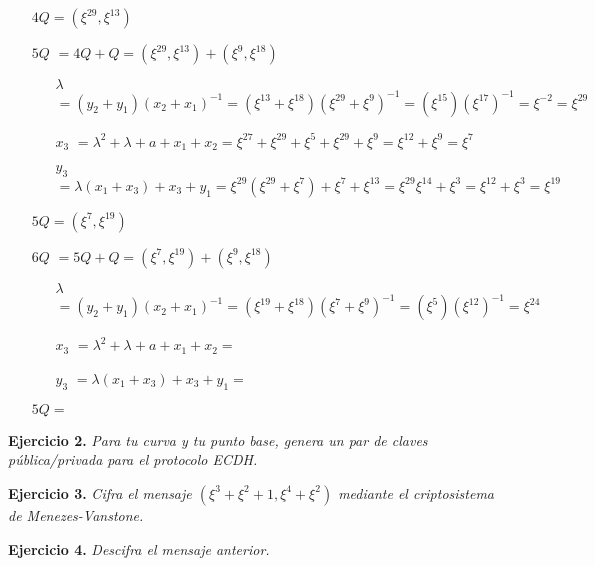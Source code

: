 \documentclass[fleqn]{article}
\begin{document}
\begin{itemize}
\begin{itemize}
            \end{itemize}
            $4Q = (\xi^{29}, \xi^{13})$
        \item[$5Q$] $ = 4Q + Q = (\xi^{29}, \xi^{13}) + (\xi^9, \xi^{18})$
            \begin{itemize}
                \item[$\lambda$] $ = (y_2 + y_1)(x_2 + x_1)^{-1} = (\xi^{13} + \xi^{18})(\xi^{29} + \xi^{9})^{-1} = (\xi^{15})(\xi^{17})^{-1} = \xi^{-2} = \xi^{29}$
                \item[$x_3$] $ = \lambda^2 + \lambda + a + x_1 + x_2 = \xi^{27} + \xi^{29} + \xi^{5} + \xi^{29} + \xi^{9} = \xi^{12} + \xi^{9} = \xi^{7}$
                \item[$y_3$] $ = \lambda(x_1 + x_3) + x_3 + y_1 = \xi^{29}(\xi^{29} + \xi^{7}) + \xi^{7} + \xi^{13} = \xi^{29}\xi^{14} + \xi^{3} = \xi^{12} + \xi^{3} = \xi^{19}$
            \end{itemize}
            $5Q = (\xi^{7}, \xi^{19})$
        \item[$6Q$] $ = 5Q + Q = (\xi^{7}, \xi^{19}) + (\xi^9, \xi^{18})$
            \begin{itemize}
                \item[$\lambda$] $ = (y_2 + y_1)(x_2 + x_1)^{-1} = (\xi^{19} + \xi^{18})(\xi^{7} + \xi^{9})^{-1} = (\xi^{5})(\xi^{12})^{-1} = \xi^{24}$
                \item[$x_3$] $ = \lambda^2 + \lambda + a + x_1 + x_2 = $
                \item[$y_3$] $ = \lambda(x_1 + x_3) + x_3 + y_1 = $
            \end{itemize}
            $5Q = $

    \end{itemize}

    \newpage
    \textbf{Ejercicio 2. }\textit{Para tu curva y tu punto base, genera un par de claves pública/privada para el protocolo ECDH.}
    \vspace{0.5cm}


    \newpage
    \textbf{Ejercicio 3. }\textit{Cifra el mensaje $(\xi^3 + \xi^2 + 1, \xi^4 + \xi^2)$ mediante el criptosistema de Menezes-Vanstone.}
    \vspace{0.5cm}


    \newpage
    \textbf{Ejercicio 4. }\textit{Descifra el mensaje anterior.}
\end{document}
